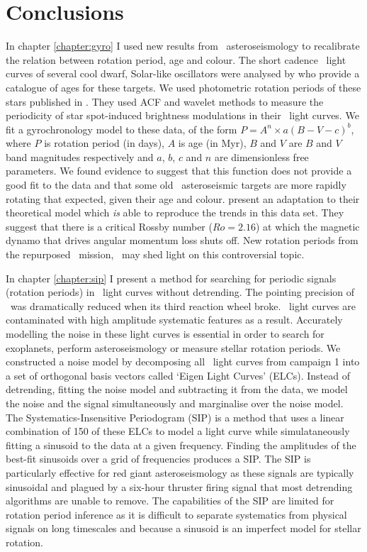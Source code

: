 \chapter{Conclusions}
\label{chapter:conclusions}

In chapter \ref{chapter:gyro} I used new results from \kepler\
asteroseismology to recalibrate the relation between rotation period, age and
colour.
The short cadence \kepler\ light curves of several cool dwarf, Solar-like
oscillators were analysed by \citet{Chaplin2014} who provide a catalogue of
ages for these targets.
We used photometric rotation periods of these stars published in
\citet{Garcia2014}.
They used ACF and wavelet methods to measure the periodicity of star
spot-induced brightness modulations in their \kepler\ light curves.
We fit a gyrochronology model to these data, of the form $P = A^n \times
a(B-V-c)^b$, where $P$ is rotation period (in days), $A$ is age (in Myr), $B$
and $V$ are $B$ and $V$ band magnitudes respectively and $a$, $b$, $c$ and $n$ are
dimensionless free parameters.
We found evidence to suggest that this function does not provide a good fit to
the data and that some old \kepler\ asteroseismic targets are more rapidly
rotating that expected, given their age and colour.
\citet{Vansaders2016} present an adaptation to their theoretical model which
{\it is} able to reproduce the trends in this data set.
They suggest that there is a critical Rossby number ($Ro=2.16$) at which the
magnetic dynamo that drives angular momentum loss shuts off.
New rotation periods from the repurposed \kepler\ mission, \ktwo\ may shed
light on this controversial topic.

In chapter \ref{chapter:sip} I present a method for searching for periodic
signals (\eg rotation periods) in \ktwo\ light curves without detrending.
The pointing precision of \kepler\ was dramatically reduced when its third
reaction wheel broke.
\ktwo\ light curves are contaminated with high amplitude systematic features
as a result.
Accurately modelling the noise in these light curves is essential in order to
search for exoplanets, perform asteroseismology or measure stellar rotation
periods.
We constructed a noise model by decomposing all \ktwo\ light curves from
campaign 1 into a set of orthogonal basis vectors called `Eigen Light Curves'
(ELCs).
Instead of detrending, fitting the noise model and subtracting it from the
data, we model the noise and the signal simultaneously and marginalise over
the noise model.
The Systematics-Insensitive Periodogram (SIP) is a method that uses a linear
combination of 150 of these ELCs to model a light curve while simulataneously
fitting a sinusoid to the data at a given frequency.
Finding the amplitudes of the best-fit sinusoids over a grid of frequencies
produces a SIP.
The SIP is particularly effective for red giant asteroseismology as these
signals are typically sinusoidal and plagued by a six-hour thruster firing
signal that most detrending algorithms are unable to remove.
The capabilities of the SIP are limited for rotation period inference as
it is difficult to separate systematics from physical signals on long
timescales and because a sinusoid is an imperfect model for stellar rotation.


